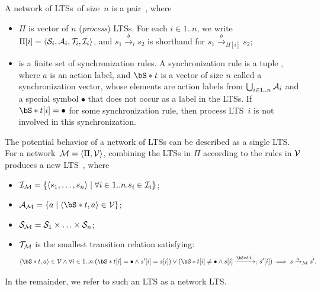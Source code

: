 \begin{definition}
A network of LTSs~\smodel of size~$n$ is a pair~\networktuple, where
\begin{itemize}
\item $\Pi$ is vector of $n$ ({\it process}) LTSs.
For each $i \in 1..n$, we write $\Pi[i] = \langle {\mathcal{S}_{i}}, {\mathcal{A}_{i}}, {\mathcal{T}_{i}}, \mathcal{I}_{i} \rangle$, and $s_1\xrightarrow{b}_i s_2$ is shorthand for $s_1\xrightarrow{b}_{\Pi[i]} s_2$;
\item \synchrules is a finite set of synchronization rules.
A synchronization rule is a tuple \syncruletuple, where $a$ is an action label, and $\vectornot{t}$ is a vector of size $n$ called a synchronization vector, whose elements are action labels from $\bigcup_{i\in 1..n} {\mathcal{A}_{i}}$ and a special symbol $\bullet$ that does not occur as a label in the LTSs.
If~$\vectornot{t}[i] = \bullet$ for some synchronization rule, then process LTS~$i$ is not involved in this synchronization.
\end{itemize}
\end{definition}

The potential behavior of a network of LTSs can be described as a single LTS.
For a network~$\mathcal{M} = \langle \Pi, {\mathcal{V}} \rangle$, combining the LTSs in $\Pi$ according to the rules in ${\mathcal{V}}$ produces a new LTS~\ltstuple{\smodel}, where
\begin{itemize}
\item $\mathcal{I}_{\mathcal{M}} = \{ \langle s_{1},\ldots, s_{n} \rangle \mid \forall i \in 1..n . s_{i} \in \mathcal{I}_{i} \}$;
\item $\actions{\smodel} = \{a \mid \langle \vectornot{t}, a \rangle \in \synchrules \}$;
\item ${\mathcal{S}_{\mathcal{M}}} = {\mathcal{S}_{1}} \times \ldots \times {\mathcal{S}_{n}}$;
\item ${\mathcal{T}_{\mathcal{M}}}$ is the smallest transition relation satisfying:
\[
\langle \vectornot{t}, a \rangle \in \synchrules \wedge \forall i \in 1..n . (\vectornot{t}[i] = \bullet \wedge s'[i]=s[i]) \vee (\vectornot{t}[i] \neq \bullet \wedge s[i]\xrightarrow{\vectornot{t}[i]}_i s'[i]) \implies s\xrightarrow{a}_{\smodel} s'.
\]
\end{itemize}

\noindent
In the remainder, we refer to such an LTS as a network LTS.



